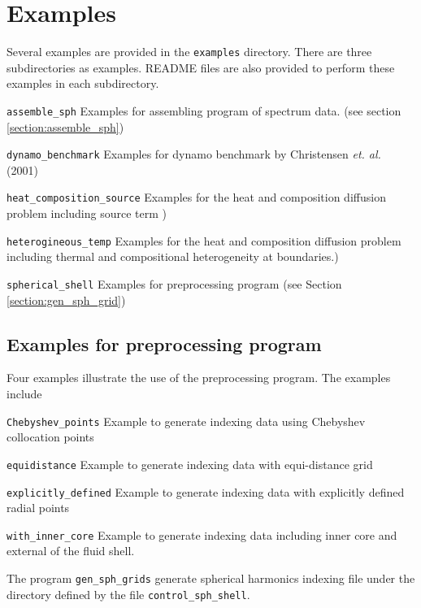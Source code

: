 \newpage
\section{Examples} \label{section:examples}
Several examples are provided in the \verb|examples| directory. There are three subdirectories as examples. README files are also provided to perform these examples in each subdirectory.
%
\begin{description}
\item{\tt assemble\_sph}    Examples for assembling program of spectrum data. (see section \ref{section:assemble_sph})
\item{\tt dynamo\_benchmark} Examples for dynamo benchmark by Christensen {\it et. al.} (2001)
\item{\tt heat\_composition\_source} Examples for the heat and composition diffusion problem including source term )
\item{\tt heterogineous\_temp} Examples for the heat and composition diffusion problem including thermal and compositional heterogeneity at boundaries.)
\item{\tt spherical\_shell} Examples for preprocessing program (see Section \ref{section:gen_sph_grid})
\end{description}
%

\subsection{Examples for preprocessing program}
Four examples illustrate the use of the preprocessing program. The examples include
%
\begin{description}
\item{\tt Chebyshev\_points} \label{href_t:gen_Chebyshev} Example to generate indexing data using Chebyshev collocation points
\item{\tt equidistance} \label{href_t:gen_equidistance} Example to generate indexing data with equi-distance grid
\item{\tt explicitly\_defined} \label{href_t:gen_explicit} Example to generate indexing data with explicitly defined radial points
\item{\tt with\_inner\_core} \label{href_t:gen_w_innercore} Example to generate indexing data including inner core and external of the fluid shell.
\end{description}

The program \verb|gen_sph_grids| generate spherical harmonics indexing file under the directory defined by the file \verb|control_sph_shell|.
%
